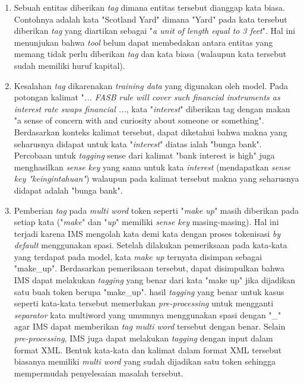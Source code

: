 \begin{enumerate}
	\item Sebuah entitas diberikan \textit{tag} dimana entitas tersebut dianggap kata biasa. Contohnya adalah kata "Scotland Yard" dimana "Yard" pada kata tersebut diberikan \textit{tag} yang diartikan sebagai "\textit{a unit of length equal to 3 feet}". Hal ini menunjukan bahwa \textit{tool} belum dapat membedakan antara entitas yang memang tidak perlu diberikan \textit{tag} dan kata biasa (walaupun kata tersebut sudah memiliki huruf kapital).
	
	
	\item Kesalahan \textit{tag} dikarenakan \textit{training data} yang digunakan oleh model. Pada potongan kalimat "\textit{... FASB rule will cover such financial instruments as interest rate swaps financial ...}, kata "\textit{interest}" diberikan tag dengan makan "a sense of concern with and curiosity about someone or something". Berdasarkan konteks kalimat tersebut, dapat diketahui bahwa makna yang seharusnya didapat untuk kata "\textit{interest}" diatas ialah "bunga bank". Percobaan untuk \textit{tagging} sense dari kalimat "bank interest is high" juga menghasilkan \textit{sense key} yang sama untuk kata \textit{interest} (mendapatkan \textit{sense key "keingintahuan"}) walaupun pada kalimat tersebut makna yang seharusnya didapat adalah "bunga bank".
		
	\item Pemberian \textit{tag} pada \textit{multi word} token seperti "\textit{make up}" masih diberikan pada setiap kata ("\textit{make}" dan "\textit{up}" memiliki \textit{sense key} masing-masing). Hal ini terjadi karena IMS mengolah kata demi kata dengan proses tokenisasi \textit{by default} menggunakan spasi. Setelah dilakukan pemeriksaan pada kata-kata yang terdapat pada model, kata \textit{make up} ternyata disimpan sebagai "make\_up". Berdasarkan pemeriksaan tersebut, dapat disimpulkan bahwa IMS dapat melakukan \textit{tagging} yang benar dari kata "make up" jika dijadikan satu buah token berupa "make\_up". hasil \textit{tagging} yang benar untuk kasus seperti kata-kata tersebut memerlukan \textit{pre-processing} untuk mengganti \textit{separator} kata multiword yang umumnya menggunakan spasi dengan "\_" agar IMS dapat memberikan \textit{tag multi word} tersebut dengan benar. Selain \textit{pre-processing},  IMS juga dapat melakukan \textit{tagging} dengan input dalam format XML. Bentuk kata-kata dan kalimat dalam format XML tersebut biasanya memiliki \textit{multi word} yang sudah dijadikan satu token sehingga mempermudah penyelesaian masalah tersebut.
\end{enumerate}

